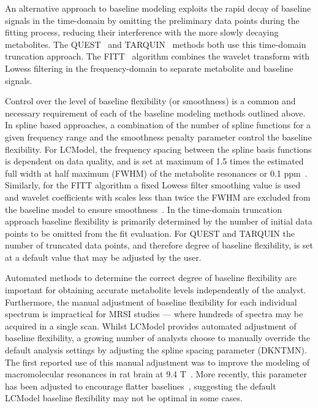 \documentclass[num-refs]{wiley-article}
\begin{document}
An alternative approach to baseline modeling exploits the rapid decay of baseline signals in the time-domain by omitting the preliminary data points during the fitting process, reducing their interference with the more slowly decaying metabolites. The QUEST~\cite{Ratiney2005} and TARQUIN~\cite{Wilson2011} methods both use this time-domain truncation approach. The FITT~\cite{Young1998} algorithm combines the wavelet transform with Lowess filtering in the frequency-domain to separate metabolite and baseline signals.

Control over the level of baseline flexibility (or smoothness) is a common and necessary requirement of each of the baseline modeling methods outlined above. In spline based approaches, a combination of the number of spline functions for a given frequency range and the smoothness penalty parameter control the baseline flexibility. For LCModel, the frequency spacing between the spline basis functions is dependent on data quality, and is set at maximum of 1.5 times the estimated full width at half maximum (FWHM) of the metabolite resonances or 0.1 ppm~\cite{Provencher1993}. Similarly, for the FITT algorithm a fixed Lowess filter smoothing value is used and wavelet coefficients with scales less than twice the FWHM are excluded from the baseline model to ensure smoothness~\cite{Young1998}. In the time-domain truncation approach baseline flexibility is primarily determined by the number of initial data points to be omitted from the fit evaluation. For QUEST and TARQUIN the number of truncated data points, and therefore degree of baseline flexibility, is set at a default value that may be adjusted by the user.

Automated methods to determine the correct degree of baseline flexibility are important for obtaining accurate metabolite levels independently of the analyst. Furthermore, the manual adjustment of baseline flexibility for each individual spectrum is impractical for MRSI studies --- where hundreds of spectra may be acquired in a single scan. Whilst LCModel provides automated adjustment of baseline flexibility, a growing number of analysts choose to manually override the default analysis settings by adjusting the spline spacing parameter (DKNTMN). The first reported use of this manual adjustment was to improve the modeling of macromolecular resonances in rat brain at 9.4 T~\cite{Pfeuffer1999}. More recently, this parameter has been adjusted to encourage flatter baselines~\cite{Deelchand2016,Terpstra2010,Marjanska2018}, suggesting the default LCModel baseline flexibility may not be optimal in some cases.
\end{document}
